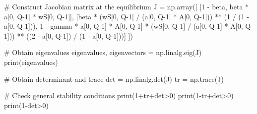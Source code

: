 \documentclass[
  letterpaper,
  DIV=11,
  numbers=noendperiod]{scrreprt}
\newenvironment{Shaded}{\begin{snugshade}}{\end{snugshade}}
\newcommand{\BuiltInTok}[1]{\textcolor[rgb]{0.00,0.23,0.31}{#1}}
\newcommand{\CommentTok}[1]{\textcolor[rgb]{0.37,0.37,0.37}{#1}}
\newcommand{\DecValTok}[1]{\textcolor[rgb]{0.68,0.00,0.00}{#1}}
\newcommand{\NormalTok}[1]{\textcolor[rgb]{0.00,0.23,0.31}{#1}}
\newcommand{\OperatorTok}[1]{\textcolor[rgb]{0.37,0.37,0.37}{#1}}
\begin{document}
\begin{tcolorbox}
\begin{Shaded}
\begin{Highlighting}[]
\CommentTok{\# Construct Jacobian matrix at the equilibrium }
\NormalTok{J }\OperatorTok{=}\NormalTok{ np.array([}
\NormalTok{    [}\DecValTok{1} \OperatorTok{{-}}\NormalTok{ beta, beta }\OperatorTok{*}\NormalTok{ a[}\DecValTok{0}\NormalTok{, Q}\OperatorTok{{-}}\DecValTok{1}\NormalTok{] }\OperatorTok{*}\NormalTok{ wS[}\DecValTok{0}\NormalTok{, Q}\OperatorTok{{-}}\DecValTok{1}\NormalTok{]],}
\NormalTok{    [beta }\OperatorTok{*}\NormalTok{ (wS[}\DecValTok{0}\NormalTok{, Q}\OperatorTok{{-}}\DecValTok{1}\NormalTok{] }\OperatorTok{/}\NormalTok{ (a[}\DecValTok{0}\NormalTok{, Q}\OperatorTok{{-}}\DecValTok{1}\NormalTok{] }\OperatorTok{*}\NormalTok{ A[}\DecValTok{0}\NormalTok{, Q}\OperatorTok{{-}}\DecValTok{1}\NormalTok{])) }\OperatorTok{**}\NormalTok{ (}\DecValTok{1} \OperatorTok{/}\NormalTok{ (}\DecValTok{1} \OperatorTok{{-}}\NormalTok{ a[}\DecValTok{0}\NormalTok{, Q}\OperatorTok{{-}}\DecValTok{1}\NormalTok{])),}
     \DecValTok{1} \OperatorTok{{-}}\NormalTok{ gamma }\OperatorTok{*}\NormalTok{ a[}\DecValTok{0}\NormalTok{, Q}\OperatorTok{{-}}\DecValTok{1}\NormalTok{] }\OperatorTok{*}\NormalTok{ A[}\DecValTok{0}\NormalTok{, Q}\OperatorTok{{-}}\DecValTok{1}\NormalTok{] }\OperatorTok{*}\NormalTok{ (wS[}\DecValTok{0}\NormalTok{, Q}\OperatorTok{{-}}\DecValTok{1}\NormalTok{] }\OperatorTok{/}\NormalTok{ (a[}\DecValTok{0}\NormalTok{, Q}\OperatorTok{{-}}\DecValTok{1}\NormalTok{] }\OperatorTok{*}\NormalTok{ A[}\DecValTok{0}\NormalTok{, Q}\OperatorTok{{-}}\DecValTok{1}\NormalTok{])) }\OperatorTok{**}\NormalTok{ ((}\DecValTok{2} \OperatorTok{{-}}\NormalTok{ a[}\DecValTok{0}\NormalTok{, Q}\OperatorTok{{-}}\DecValTok{1}\NormalTok{]) }\OperatorTok{/}\NormalTok{ (}\DecValTok{1} \OperatorTok{{-}}\NormalTok{ a[}\DecValTok{0}\NormalTok{, Q}\OperatorTok{{-}}\DecValTok{1}\NormalTok{]))]}
\NormalTok{])}

\CommentTok{\# Obtain eigenvalues}
\NormalTok{eigenvalues, eigenvectors }\OperatorTok{=}\NormalTok{ np.linalg.eig(J)}
\BuiltInTok{print}\NormalTok{(eigenvalues)}

\CommentTok{\# Obtain determinant and trace}
\NormalTok{det }\OperatorTok{=}\NormalTok{ np.linalg.det(J)}
\NormalTok{tr }\OperatorTok{=}\NormalTok{ np.trace(J)}

\CommentTok{\# Check general stability conditions}
\BuiltInTok{print}\NormalTok{(}\DecValTok{1}\OperatorTok{+}\NormalTok{tr}\OperatorTok{+}\NormalTok{det}\OperatorTok{\textgreater{}}\DecValTok{0}\NormalTok{)}
\BuiltInTok{print}\NormalTok{(}\DecValTok{1}\OperatorTok{{-}}\NormalTok{tr}\OperatorTok{+}\NormalTok{det}\OperatorTok{\textgreater{}}\DecValTok{0}\NormalTok{)}
\BuiltInTok{print}\NormalTok{(}\DecValTok{1}\OperatorTok{{-}}\NormalTok{det}\OperatorTok{\textgreater{}}\DecValTok{0}\NormalTok{)}


\end{Highlighting}
\end{Shaded}
\end{tcolorbox}
\end{document}
